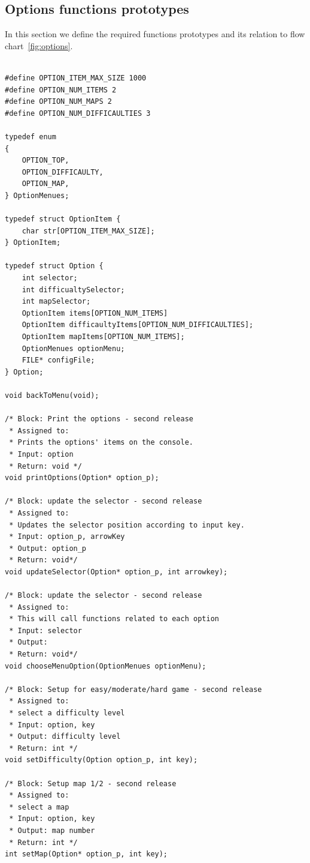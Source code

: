 \subsection{Options functions prototypes}

In this section we define the required functions prototypes and its relation to flow chart~\ref{fig:options}.

\begin{verbatim}

#define OPTION_ITEM_MAX_SIZE 1000
#define OPTION_NUM_ITEMS 2
#define OPTION_NUM_MAPS 2
#define OPTION_NUM_DIFFICAULTIES 3

typedef enum 
{
    OPTION_TOP,
    OPTION_DIFFICAULTY,
    OPTION_MAP,
} OptionMenues;

typedef struct OptionItem {
    char str[OPTION_ITEM_MAX_SIZE];
} OptionItem;

typedef struct Option {
    int selector;
    int difficualtySelector;
    int mapSelector;
    OptionItem items[OPTION_NUM_ITEMS]
    OptionItem difficaultyItems[OPTION_NUM_DIFFICAULTIES];
    OptionItem mapItems[OPTION_NUM_ITEMS];
    OptionMenues optionMenu;
    FILE* configFile;
} Option;

void backToMenu(void);

/* Block: Print the options - second release
 * Assigned to:
 * Prints the options' items on the console.
 * Input: option
 * Return: void */
void printOptions(Option* option_p);

/* Block: update the selector - second release
 * Assigned to:
 * Updates the selector position according to input key.
 * Input: option_p, arrowKey
 * Output: option_p
 * Return: void*/
void updateSelector(Option* option_p, int arrowkey);

/* Block: update the selector - second release
 * Assigned to:
 * This will call functions related to each option
 * Input: selector
 * Output: 
 * Return: void*/
void chooseMenuOption(OptionMenues optionMenu);

/* Block: Setup for easy/moderate/hard game - second release
 * Assigned to:
 * select a difficulty level
 * Input: option, key
 * Output: difficulty level
 * Return: int */
void setDifficulty(Option option_p, int key);

/* Block: Setup map 1/2 - second release
 * Assigned to:
 * select a map
 * Input: option, key
 * Output: map number
 * Return: int */
int setMap(Option* option_p, int key);

\end{verbatim}